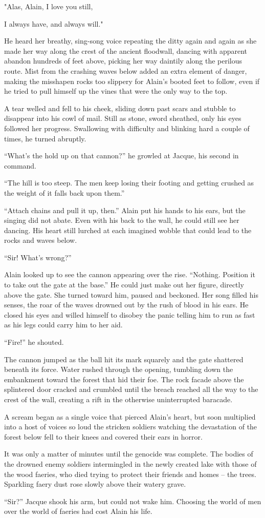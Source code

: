 "Alas, Alain, I love you still,

I always have, and always will."

He heard her breathy, sing-song voice repeating the ditty again and
again as she made her way along the crest of the ancient floodwall,
dancing with apparent abandon hundreds of feet above, picking her way
daintily along the perilous route. Mist from the crashing waves below
added an extra element of danger, making the misshapen rocks too
slippery for Alain's booted feet to follow, even if he tried to pull
himself up the vines that were the only way to the top.

A tear welled and fell to his cheek, sliding down past scars and stubble
to disappear into his cowl of mail. Still as stone, sword sheathed, only
his eyes followed her progress. Swallowing with difficulty and blinking
hard a couple of times, he turned abruptly.

``What's the hold up on that cannon?'' he growled at Jacque, his second
in command.

``The hill is too steep. The men keep losing their footing and getting
crushed as the weight of it falls back upon them.''

``Attach chains and pull it up, then.'' Alain put his hands to his ears,
but the singing did not abate. Even with his back to the wall, he could
still see her dancing. His heart still lurched at each imagined wobble
that could lead to the rocks and waves below.

``Sir! What's wrong?''

Alain looked up to see the cannon appearing over the rise. ``Nothing.
Position it to take out the gate at the base.'' He could just make out
her figure, directly above the gate. She turned toward him, paused and
beckoned. Her song filled his senses, the roar of the waves drowned out
by the rush of blood in his ears. He closed his eyes and willed himself
to disobey the panic telling him to run as fast as his legs could carry
him to her aid.

``Fire!'' he shouted.

The cannon jumped as the ball hit its mark squarely and the gate
shattered beneath its force. Water rushed through the opening, tumbling
down the embankment toward the forest that hid their foe. The rock
facade above the splintered door cracked and crumbled until the breach
reached all the way to the crest of the wall, creating a rift in the
otherwise uninterrupted baracade.

A scream began as a single voice that pierced Alain's heart, but soon
multiplied into a host of voices so loud the stricken soldiers watching
the devastation of the forest below fell to their knees and covered
their ears in horror.

It was only a matter of minutes until the genocide was complete. The
bodies of the drowned enemy soldiers intermingled in the newly created
lake with those of the wood faeries, who died trying to protect their
friends and homes -- the trees. Sparkling faery dust rose slowly above
their watery grave.

``Sir?'' Jacque shook his arm, but could not wake him. Choosing the
world of men over the world of faeries had cost Alain his life.
